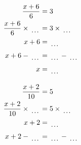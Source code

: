 \documentclass[12pt]{article}
\newcounter{minipagecount}
\begin{document}
\begin{multicols}{2}
\begin{minipage}[t]{0.45\textwidth}
    \raggedright %
    \begin{align*} %
        \frac{x + 6}{6} &= 3\\
        \frac{x + 6}{6} \times\dotuline{\hspace{5mm}} &= 3 \times\dotuline{\hspace{5mm}}\\
        x + 6 &= \dotuline{\hspace{5mm}}\\
        x + 6 - \dotuline{\hspace{5mm}} &= \dotuline{\hspace{5mm}} - \dotuline{\hspace{5mm}}\\
        x &= \dotuline{\hspace{5mm}}\\
    \end{align*}
\end{minipage} %
\noindent{(\theminipagecount)}\hspace{0.1mm} %
\begin{minipage}[t]{0.45\textwidth} %
    \vspace{-26pt}  %
    \raggedright %
    \begin{align*} %
        \frac{x + 2}{10} &= 5\\
        \frac{x + 2}{10} \times\dotuline{\hspace{5mm}} &= 5 \times\dotuline{\hspace{5mm}}\\
        x + 2 &= \dotuline{\hspace{5mm}}\\
        x + 2 - \dotuline{\hspace{5mm}} &= \dotuline{\hspace{5mm}} - \dotuline{\hspace{5mm}}\\

\end{align*}
\end{minipage}
\end{multicols}
\end{document}
